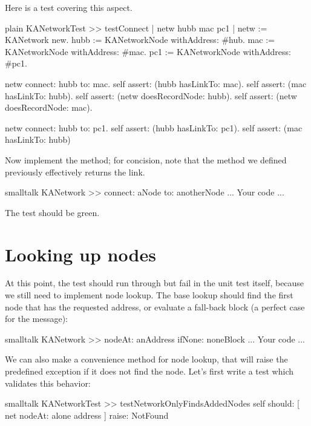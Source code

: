 \documentclass[10pt,twoside,english]{_support/latex/sbabook/sbabook}
\begin{document}
Here is a test covering this aspect.

\begin{displaycode}{plain}
KANetworkTest >> testConnect
	| netw hubb mac pc1 |
	netw := KANetwork new.
	hubb := KANetworkNode withAddress: #hub.
	mac := KANetworkNode withAddress: #mac.
	pc1 := KANetworkNode withAddress: #pc1.

	netw connect: hubb to: mac.
	self assert: (hubb hasLinkTo: mac).
	self assert: (mac hasLinkTo: hubb).
	self assert: (netw doesRecordNode: hubb).
	self assert: (netw doesRecordNode: mac).

	netw connect: hubb to: pc1.
	self assert: (hubb hasLinkTo: pc1).
	self assert: (mac hasLinkTo: hubb)
\end{displaycode}

Now implement the  method; for concision, note that the  method we defined previously effectively returns the link.

\begin{displaycode}{smalltalk}
KANetwork >> connect: aNode to: anotherNode
    ... Your code ...
\end{displaycode}

The test  should be green.
\section{Looking up nodes}
At this point, the test  should run through  but fail in the unit test itself, because we still need to implement node lookup. The base lookup should find the first node that has the requested address, or evaluate a fall-back block (a perfect case for the  message):

\begin{displaycode}{smalltalk}
KANetwork >> nodeAt: anAddress ifNone: noneBlock
    ... Your code ...
\end{displaycode}

We can also make a convenience  method for node lookup, that will raise the predefined  exception if it does not find the node.
Let's first write a test which validates this behavior:

\begin{displaycode}{smalltalk}
KANetworkTest >> testNetworkOnlyFindsAddedNodes
    self
        should: [ net nodeAt: alone address ]
        raise: NotFound
\end{displaycode}
\end{document}
